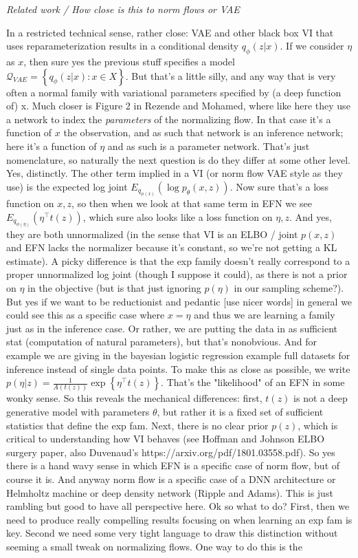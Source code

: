 \documentclass{article}
\begin{document}
\emph{Related work / How close is this to norm flows or VAE}

In a restricted technical sense, rather close: VAE and other black box VI that uses reparameterization results in a conditional density $q_\phi( z | x)$.  If we consider $\eta$ as $x$, then sure yes the previous stuff specifies a model $\mathcal{Q}_{VAE} = \left\{q_\phi(z|x) : x \in X\right\}$.  But that's a little silly, and any way that is very often a normal family with variational parameters specified by (a deep function of) x.  Much closer is Figure 2 in Rezende and Mohamed, where like here they use a network to index the \emph{parameters} of the normalizing flow.  In that case it's a function of $x$ the observation, and as such that network is an inference network; here it's a function of $\eta$ and as such is a parameter network.  That's just nomenclature, so naturally the next question is do they differ at some other level.  Yes, distinctly.  The other term implied in a VI (or norm flow VAE style as they use) is the expected log joint $E_{q_{\phi(x)}}  \left( \log p_\theta(x,z)\right)$.  Now sure that's a loss function on $x,z$, so then when we look at that same term in EFN we see   $E_{q_{\phi(\eta)}}  \left( \eta^\top t(z) \right)$, which sure also looks like a loss function on $\eta,z$.  And yes, they are both unnormalized (in the sense that VI is an ELBO / joint $p(x,z)$ and EFN lacks the normalizer because it's constant, so we're not getting a KL estimate).  A picky difference is that the exp family doesn't really correspond to a proper unnormalized log joint (though I suppose it could), as there is not a prior on $\eta$ in the objective (but is that just ignoring $p(\eta)$ in our sampling scheme?). But yes if we want to be reductionist and pedantic [use nicer words] in general we could see this as a specific case where $x=\eta$ and thus we are learning a family just as in the inference case.  Or rather, we are putting the data in as sufficient stat (computation of natural parameters), but that's nonobvious.  And for example we are giving in the bayesian logistic regression example full datasets for inference instead of single data points.  To make this as close as possible, we write $p(\eta | z)  = \frac{1}{A(t(z))} \exp\left\{ \eta^\top t(z)\right\}$.  That's the "likelihood" of an EFN in some wonky sense.  So this reveals the mechanical differences: first, $t(z)$ is not a deep generative model with parameters $\theta$, but rather it is a fixed set of sufficient statistics that define the exp fam.  Next, there is no clear prior $p(z)$, which is critical to understanding how VI behaves (see Hoffman and Johnson ELBO surgery paper, also Duvenaud's https://arxiv.org/pdf/1801.03558.pdf).  So yes there is a hand wavy sense in which EFN is a specific case of norm flow, but of course it is.  And anyway norm flow is a specific case of a DNN architecture or Helmholtz machine or deep density network (Ripple and Adams).  This is just rambling but good to have all perspective here.  Ok so what to do?  First, then we need to produce really compelling results focusing on when learning an exp fam is key.  Second we need some very tight language to draw this distinction without seeming a small tweak on normalizing flows.  One way to do this is the 
\end{document}
